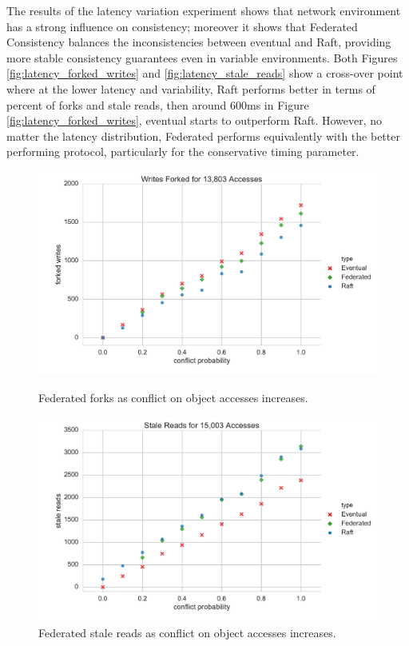 \documentclass{article}
\begin{document}
The results of the latency variation experiment shows that network environment has a strong influence on consistency; moreover it shows that Federated Consistency balances the inconsistencies between eventual and Raft, providing more stable consistency guarantees even in variable environments. Both Figures \ref{fig:latency_forked_writes} and \ref{fig:latency_stale_reads} show a cross-over point where at the lower latency and variability, Raft performs better in terms of percent of forks and stale reads, then around 600ms in Figure \ref{fig:latency_forked_writes}, eventual starts to outperform Raft. However, no matter the latency distribution, Federated performs equivalently with the better performing protocol, particularly for the conservative timing parameter.

\begin{figure}
    \centering
      \includegraphics[width=\linewidth]{figures/federated/forked_writes_conflict}
      \caption{Federated forks as conflict on object accesses increases.}
      \label{fig:conflict_forked_writes}
    \endminipage\hfill
      \includegraphics[width=\linewidth]{figures/federated/stale_reads_conflict}
      \caption{Federated stale reads as conflict on object accesses increases.}
      \label{fig:conflict_stale_reads}
    \endminipage
\end{figure}
\end{document}
